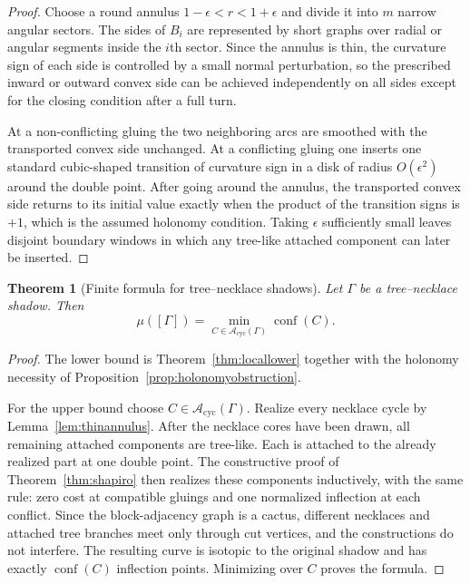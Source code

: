 \documentclass[11pt]{article}
\newtheorem{theorem}{Theorem}[section]
\newcommand{\A}{\mathcal A}
\newcommand{\conf}{\operatorname{conf}}
\newcommand{\cyc}{\mathrm{cyc}}
\begin{document}
\begin{proof}
Choose a round annulus $1-\epsilon<r<1+\epsilon$ and divide it into $m$ narrow angular sectors.  The sides of $B_i$ are represented by short graphs over radial or angular segments inside the $i$th sector.  Since the annulus is thin, the curvature sign of each side is controlled by a small normal perturbation, so the prescribed inward or outward convex side can be achieved independently on all sides except for the closing condition after a full turn.

At a non-conflicting gluing the two neighboring arcs are smoothed with the transported convex side unchanged.  At a conflicting gluing one inserts one standard cubic-shaped transition of curvature sign in a disk of radius $O(\epsilon^2)$ around the double point.  After going around the annulus, the transported convex side returns to its initial value exactly when the product of the transition signs is $+1$, which is the assumed holonomy condition.  Taking $\epsilon$ sufficiently small leaves disjoint boundary windows in which any tree-like attached component can later be inserted.
\end{proof}

\begin{theorem}[Finite formula for tree--necklace shadows]\label{thm:necklaceformula}
Let $\Gamma$ be a tree--necklace shadow.  Then
\[
 \mu([\Gamma])=
 \min_{C\in\A_{\cyc}(\Gamma)}\conf(C).
\]
\end{theorem}

\begin{proof}
The lower bound is Theorem~\ref{thm:locallower} together with the holonomy necessity of Proposition~\ref{prop:holonomyobstruction}.

For the upper bound choose $C\in\A_{\cyc}(\Gamma)$.  Realize every necklace cycle by Lemma~\ref{lem:thinannulus}.  After the necklace cores have been drawn, all remaining attached components are tree-like.  Each is attached to the already realized part at one double point.  The constructive proof of Theorem~\ref{thm:shapiro} then realizes these components inductively, with the same rule: zero cost at compatible gluings and one normalized inflection at each conflict.  Since the block-adjacency graph is a cactus, different necklaces and attached tree branches meet only through cut vertices, and the constructions do not interfere.  The resulting curve is isotopic to the original shadow and has exactly $\conf(C)$ inflection points.  Minimizing over $C$ proves the formula.
\end{proof}
\end{document}
